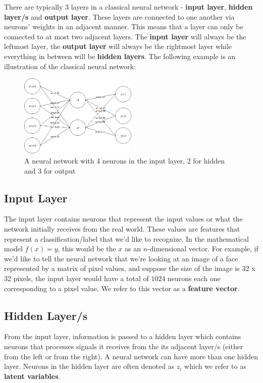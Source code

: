 \documentclass[a4paper]{article}
\begin{document}
There are typically 3 layers in a classical neural network - \textbf{input layer}, \textbf{hidden layer/s} and \textbf{output layer}. These layers are connected to one another via neurons' weights in an adjacent manner. This means that a layer can only be connected to at most two adjacent layers. The \textbf{input layer} will always be the leftmost layer, the \textbf{output layer} will always be the rightmost layer while everything in between will be \textbf{hidden layers}. The following example is an illustration of the classical neural network:

\begin{figure}[!htb]
\centering
\includegraphics[width=0.5\textwidth]{neural_network.png}
\caption{\label{fig:neuron}A neural network with 4 neurons in the input layer, 2 for hidden and 3 for output}
\end{figure}

\subsection{Input Layer}
The input layer contains neurons that represent the input values or what the network initially receives from the real world. These values are features that represent a classification/label that we'd like to recognize. In the mathematical model $f(x) = y$, this would be the $x$ as an $n$-dimensional vector. For example, if we'd like to tell the neural network that we're looking at an image of a face represented by a matrix of pixel values, and suppose the size of the image is 32 x 32 pixels, the input layer would have a total of $1024$ neurons each one corresponding to a pixel value. We refer to this vector as a \textbf{feature vector}.

\subsection{Hidden Layer/s}
From the input layer, information is passed to a hidden layer which contains neurons that processes signals it receives from the its adjacent layer/s (either from the left or from the right). A neural network can have more than one hidden layer. Neurons in the hidden layer are often denoted as $z_{i}$ which we refer to as \textbf{latent variables}.
\end{document}
